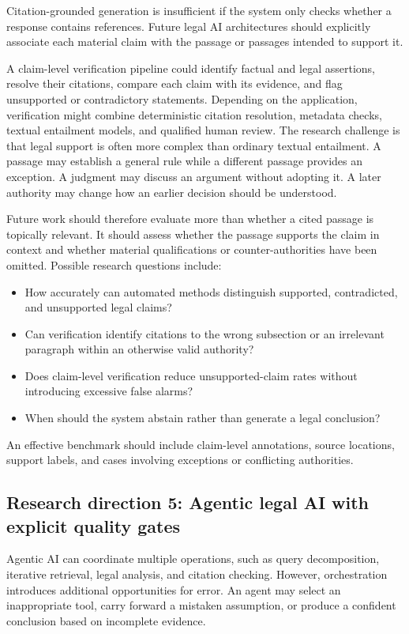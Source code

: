 Citation-grounded generation is insufficient if the system only checks whether a response contains
references. Future legal AI architectures should explicitly associate each material claim with the passage
or passages intended to support it.

A claim-level verification pipeline could identify factual and legal assertions, resolve their citations,
compare each claim with its evidence, and flag unsupported or contradictory statements. Depending on the
application, verification might combine deterministic citation resolution, metadata checks, textual
entailment models, and qualified human review. The research challenge is that legal support is often more
complex than ordinary textual entailment. A passage may establish a general rule while a different passage
provides an exception. A judgment may discuss an argument without adopting it. A later authority may change
how an earlier decision should be understood.

Future work should therefore evaluate more than whether a cited passage is topically relevant. It should
assess whether the passage supports the claim in context and whether material qualifications or
counter-authorities have been omitted. Possible research questions include:
\begin{itemize}[leftmargin=1.4em, itemsep=2pt, topsep=2pt]
\item How accurately can automated methods distinguish supported, contradicted, and unsupported legal
claims?
\item Can verification identify citations to the wrong subsection or an irrelevant paragraph within an
otherwise valid authority?
\item Does claim-level verification reduce unsupported-claim rates without introducing excessive false
alarms?
\item When should the system abstain rather than generate a legal conclusion?
\end{itemize}

An effective benchmark should include claim-level annotations, source locations, support labels, and
cases involving exceptions or conflicting authorities.

\subsection{Research direction 5: Agentic legal AI with explicit quality gates}

Agentic AI can coordinate multiple operations, such as query decomposition, iterative retrieval, legal
analysis, and citation checking. However, orchestration introduces additional opportunities for error. An
agent may select an inappropriate tool, carry forward a mistaken assumption, or produce a confident
conclusion based on incomplete evidence.

